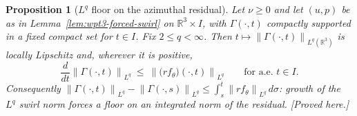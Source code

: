 \documentclass[11pt]{article}
\newtheorem{proposition}[theorem]{Proposition}
\theoremstyle{definition}
\theoremstyle{remark}
\newcommand{\R}{\mathbb{R}}
\newcommand{\norm}[1]{\left\|#1\right\|}
\begin{document}
\begin{proposition}[$L^q$ floor on the azimuthal residual]
  \label{prop:cd1-Lq}
  Let $\nu\geq0$ and let $(u,p)$ be as in Lemma~\ref{lem:wpt3-forced-swirl}
  on $\R^3\times I$, with $\Gamma(\cdot,t)$ compactly supported in a fixed
  compact set for $t\in I$. Fix $2\leq q<\infty$. Then $t\mapsto
  \norm{\Gamma(\cdot,t)}_{L^q(\R^3)}$ is locally Lipschitz and, wherever it
  is positive,
  \begin{equation}\label{eq:cd1-Lq}
    \frac{d}{dt}\norm{\Gamma(\cdot,t)}_{L^q}
      \ \leq\ \norm{\bigl(rf_\theta\bigr)(\cdot,t)}_{L^q}
    \qquad\text{for a.e. }t\in I .
  \end{equation}
  Consequently $\norm{\Gamma(\cdot,t)}_{L^q}-\norm{\Gamma(\cdot,s)}_{L^q}
  \leq\int_s^t\norm{rf_\theta}_{L^q}\,d\sigma$: growth of the $L^q$ swirl norm
  forces a floor on an \emph{integrated} norm of the residual.
  \emph{[Proved here.]}
\end{proposition}
\end{document}
